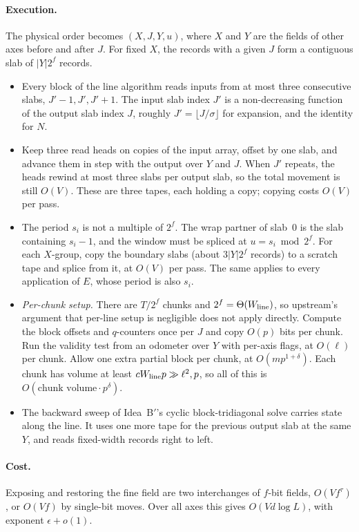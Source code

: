 \documentclass[11pt]{article}
\theoremstyle{remark}\newtheorem*{remark}{Remark}
\begin{document}
\paragraph{Execution.} The physical order becomes $(X,J,Y,u)$, where $X$ and $Y$ are the
fields of other axes before and after $J$. For fixed $X$, the records with a given $J$ form a
contiguous slab of $|Y|2^f$ records.
\begin{itemize}
\item Every block of the line algorithm reads inputs from at most three consecutive slabs,
$J'-1,J',J'+1$. The input slab index $J'$ is a non-decreasing function of the output slab
index $J$, roughly $J'=\lfloor J/\sigma\rfloor$ for expansion, and the identity for $N$.
\item Keep three read heads on copies of the input array, offset by one slab, and advance them
in step with the output over $Y$ and $J$. When $J'$ repeats, the heads rewind at most three slabs per output slab, so the total movement is still $O(V)$. These are three tapes, each holding a copy; copying costs $O(V)$ per pass.
\item The period $s_i$ is not a multiple of $2^f$. The wrap partner of slab~0 is the slab containing $s_i-1$, and the window must be spliced at $u=s_i\bmod2^f$. For each $X$-group, copy the boundary slabs (about $3|Y|2^f$ records) to a scratch tape and splice from it, at $O(V)$ per pass. The same applies to every application of $E$, whose period is also $s_i$.
\item \emph{Per-chunk setup.} There are $T/2^f$ chunks and $2^f=\Theta(W_{\rm line})$, so upstream's argument that per-line setup is negligible does not apply directly. Compute the block offsets and $q$-counters once per $J$ and copy $O(p)$ bits per chunk. Run the validity test from an odometer over $Y$ with per-axis flags, at $O(\ell)$ per chunk. Allow one extra partial block per chunk, at $O(mp^{1+\delta})$. Each chunk has volume at least $cW_{\rm line}p\gg\ell^2,p$, so all of this is $O(\text{chunk volume}\cdot p^\delta)$.
\item The backward sweep of Idea~B$'$'s cyclic block-tridiagonal solve carries state along the line. It uses one more tape for the previous output slab at the same $Y$, and reads fixed-width records right to left.
\end{itemize}

\paragraph{Cost.} Exposing and restoring the fine field are two interchanges of $f$-bit
fields, $O(Vf^\tau)$, or $O(Vf)$ by single-bit moves. Over all axes this gives
$O(Vd\log L)$, with exponent $\epsilon+o(1)$.
\end{document}
